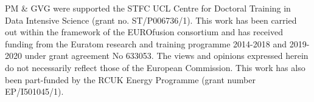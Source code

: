 {\footnotesize
PM \& GVG were supported the STFC UCL Centre for Doctoral Training in Data Intensive
Science (grant no. ST/P006736/1).
This work has been carried out within the framework of the EUROfusion consortium and has received funding from the Euratom research and training programme 2014-2018 and 2019-2020 under grant agreement No 633053. The views and opinions expressed herein do not necessarily reflect those of the European Commission.
This work has also been part-funded by the RCUK Energy Programme (grant number EP/I501045/1).
}
